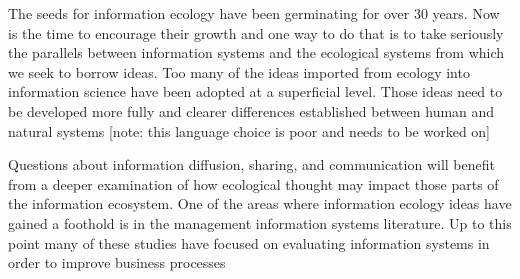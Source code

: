 The seeds for information ecology have been germinating for over 30 years. Now is the time to encourage their growth and one way to do that is to take seriously the parallels between information systems and the ecological systems from which we seek to borrow ideas. Too many of the ideas imported from ecology into information science have been adopted at a superficial level. Those ideas need to be developed more fully and clearer differences established between human and natural systems [note: this language choice is poor and needs to be worked on]

Questions about information diffusion, sharing, and communication will benefit from a deeper examination of how ecological thought may impact those parts of the information ecosystem. One of the areas where information ecology ideas have gained a foothold is in the management information systems literature. Up to this point many of these studies have focused on evaluating information systems in order to improve business processes 

